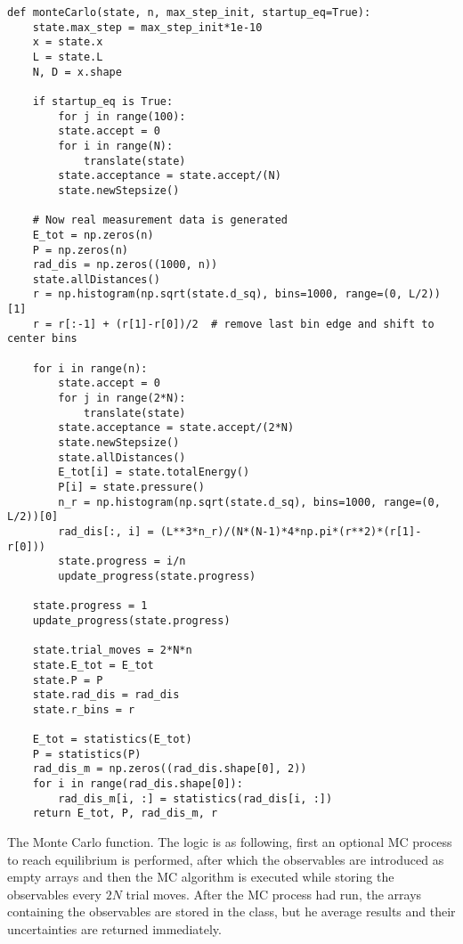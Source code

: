 \begin{listing}[ht!]
	\begin{verbatim}
def monteCarlo(state, n, max_step_init, startup_eq=True):
	state.max_step = max_step_init*1e-10
	x = state.x
	L = state.L
	N, D = x.shape
	
	if startup_eq is True:
		for j in range(100):
		state.accept = 0
		for i in range(N):
			translate(state)
		state.acceptance = state.accept/(N)
		state.newStepsize()
	
	# Now real measurement data is generated
	E_tot = np.zeros(n)
	P = np.zeros(n)
	rad_dis = np.zeros((1000, n))
	state.allDistances()
	r = np.histogram(np.sqrt(state.d_sq), bins=1000, range=(0, L/2))[1]
	r = r[:-1] + (r[1]-r[0])/2  # remove last bin edge and shift to center bins
	
	for i in range(n):
		state.accept = 0
		for j in range(2*N):
			translate(state)
		state.acceptance = state.accept/(2*N)
		state.newStepsize()
		state.allDistances()
		E_tot[i] = state.totalEnergy()
		P[i] = state.pressure()
		n_r = np.histogram(np.sqrt(state.d_sq), bins=1000, range=(0, L/2))[0]
		rad_dis[:, i] = (L**3*n_r)/(N*(N-1)*4*np.pi*(r**2)*(r[1]-r[0]))
		state.progress = i/n
		update_progress(state.progress)
	
	state.progress = 1
	update_progress(state.progress)
	
	state.trial_moves = 2*N*n
	state.E_tot = E_tot
	state.P = P
	state.rad_dis = rad_dis
	state.r_bins = r
	
	E_tot = statistics(E_tot)
	P = statistics(P)
	rad_dis_m = np.zeros((rad_dis.shape[0], 2))
	for i in range(rad_dis.shape[0]):
		rad_dis_m[i, :] = statistics(rad_dis[i, :])
	return E_tot, P, rad_dis_m, r
	\end{verbatim}
\caption{The Monte Carlo function. The logic is as following, first an optional MC process to reach equilibrium is performed, after which the observables are introduced as empty arrays and then the MC algorithm is executed while storing the observables every $2N$ trial moves. After the MC process had run, the arrays containing the observables are stored in the class, but he average results and their uncertainties are returned immediately.}
	\label{Monte Carlo}
\end{listing}
